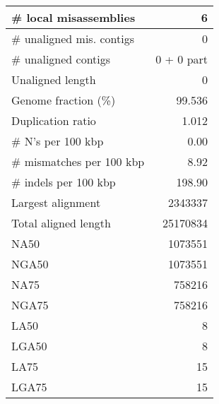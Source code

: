\documentclass[12pt,a4paper]{article}
\begin{document}
\begin{table}[ht]
\begin{center}
\begin{tabular}{|l*{1}{|r}|}
\# local misassemblies & 6 \\ \hline
\# unaligned mis. contigs & 0 \\ \hline
\# unaligned contigs & 0 + 0 part \\ \hline
Unaligned length & 0 \\ \hline
Genome fraction (\%) & 99.536 \\ \hline
Duplication ratio & 1.012 \\ \hline
\# N's per 100 kbp & 0.00 \\ \hline
\# mismatches per 100 kbp & 8.92 \\ \hline
\# indels per 100 kbp & 198.90 \\ \hline
Largest alignment & 2343337 \\ \hline
Total aligned length & 25170834 \\ \hline
NA50 & 1073551 \\ \hline
NGA50 & 1073551 \\ \hline
NA75 & 758216 \\ \hline
NGA75 & 758216 \\ \hline
LA50 & 8 \\ \hline
LGA50 & 8 \\ \hline
LA75 & 15 \\ \hline
LGA75 & 15 \\ \hline
\end{tabular}
\end{center}
\end{table}
\end{document}
